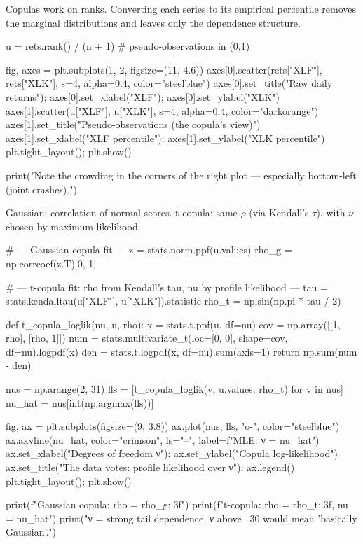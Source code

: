 \documentclass{pyportfolios-note}
\begin{document}

Copulas work on ranks. Converting each series to its empirical percentile
removes the marginal distributions and leaves only the dependence structure.

\begin{notecode}
u = rets.rank() / (n + 1)          # pseudo-observations in (0,1)

fig, axes = plt.subplots(1, 2, figsize=(11, 4.6))
axes[0].scatter(rets["XLF"], rets["XLK"], s=4, alpha=0.4, color="steelblue")
axes[0].set_title("Raw daily returns"); axes[0].set_xlabel("XLF"); axes[0].set_ylabel("XLK")
axes[1].scatter(u["XLF"], u["XLK"], s=4, alpha=0.4, color="darkorange")
axes[1].set_title("Pseudo-observations (the copula's view)")
axes[1].set_xlabel("XLF percentile"); axes[1].set_ylabel("XLK percentile")
plt.tight_layout(); plt.show()

print("Note the crowding in the corners of the right plot — especially bottom-left (joint crashes).")
\end{notecode}


Gaussian: correlation of normal scores. t-copula: same $\rho$ (via Kendall's
$\tau$), with $\nu$ chosen by maximum likelihood.

\begin{notecode}
# --- Gaussian copula fit ---
z = stats.norm.ppf(u.values)
rho_g = np.corrcoef(z.T)[0, 1]

# --- t-copula fit: rho from Kendall's tau, nu by profile likelihood ---
tau = stats.kendalltau(u["XLF"], u["XLK"]).statistic
rho_t = np.sin(np.pi * tau / 2)

def t_copula_loglik(nu, u, rho):
    x = stats.t.ppf(u, df=nu)
    cov = np.array([[1, rho], [rho, 1]])
    num = stats.multivariate_t(loc=[0, 0], shape=cov, df=nu).logpdf(x)
    den = stats.t.logpdf(x, df=nu).sum(axis=1)
    return np.sum(num - den)

nus = np.arange(2, 31)
lls = [t_copula_loglik(v, u.values, rho_t) for v in nus]
nu_hat = nus[int(np.argmax(lls))]

fig, ax = plt.subplots(figsize=(9, 3.8))
ax.plot(nus, lls, "o-", color="steelblue")
ax.axvline(nu_hat, color="crimson", ls="--", label=f"MLE: ν = {nu_hat}")
ax.set_xlabel("Degrees of freedom ν"); ax.set_ylabel("Copula log-likelihood")
ax.set_title("The data votes: profile likelihood over ν"); ax.legend()
plt.tight_layout(); plt.show()

print(f"Gaussian copula: rho = {rho_g:.3f}")
print(f"t-copula:        rho = {rho_t:.3f}, nu = {nu_hat}")
print("\nSmall ν = strong tail dependence. ν above ~30 would mean 'basically Gaussian'.")
\end{notecode}
\end{document}
